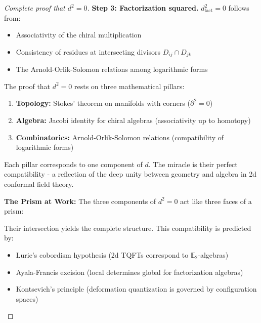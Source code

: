 \begin{proof}[Complete proof that $d^2 = 0$]
\textbf{Step 3: Factorization squared.}
$d_{\text{fact}}^2 = 0$ follows from:
\begin{itemize}
\item Associativity of the chiral multiplication
\item Consistency of residues at intersecting divisors $D_{ij} \cap D_{jk}$
\item The Arnold-Orlik-Solomon relations among logarithmic forms
\end{itemize}

\begin{remark}
The proof that $d^2 = 0$ rests on three mathematical pillars:
\begin{enumerate}
\item \textbf{Topology:} Stokes' theorem on manifolds with corners ($\partial^2 = 0$)
\item \textbf{Algebra:} Jacobi identity for chiral algebras (associativity up to homotopy)
\item \textbf{Combinatorics:} Arnold-Orlik-Solomon relations (compatibility of logarithmic forms)
\end{enumerate}

Each pillar corresponds to one component of $d$. The miracle is their perfect compatibility - a 
reflection of the deep unity between geometry and algebra in 2d conformal field theory.

\textbf{The Prism at Work:} The three components of $d^2 = 0$ act like three faces of a prism:
\begin{center}
\end{center}

Their intersection yields the complete structure. This compatibility is predicted by:
\begin{itemize}
\item Lurie's cobordism hypothesis (2d TQFTs correspond to $\mathbb{E}_2$-algebras)
\item Ayala-Francis excision (local determines global for factorization algebras)
\item Kontsevich's principle (deformation quantization is governed by configuration spaces)
\end{itemize}
\end{remark}


\end{proof}
